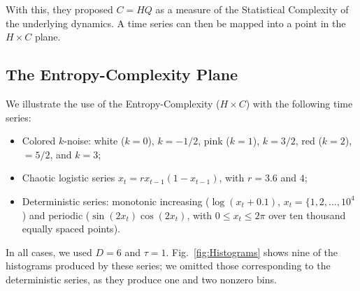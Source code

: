 \documentclass[sts]{imsart}
\begin{document}
With this, they proposed $C=HQ$ as a measure of the Statistical Complexity of the underlying dynamics.
A time series can then be mapped into a point in the $H\times C$ plane.


\subsection{The Entropy-Complexity Plane}

We illustrate the use of the Entropy-Complexity ($H\times C$) with the following time series:
\begin{itemize}
\item Colored $k$-noise: white ($k=0$), $k=-1/2$, pink ($k=1$), $k=3/2$, red ($k=2$), $=5/2$, and $k=3$;
\item Chaotic logistic series $x_t = r x_{t-1} (1 - x_{t-1})$, with $r=3.6$ and $4$;
\item Deterministic series: monotonic increasing ($\log(x_t+0.1)$, $x_t=\{1,2,\dots,10^4$) and periodic ($\sin(2x_t)\cos(2x_t)$, with $0\leq x_t\leq 2\pi$ over ten thousand equally spaced points).
\end{itemize}
In all cases, we used $D=6$ and $\tau=1$.
Fig.~\ref{fig:Histograms} shows nine of the histograms produced by these series;
we omitted those corresponding to the deterministic series, as they produce one and two nonzero bins.
\end{document}
